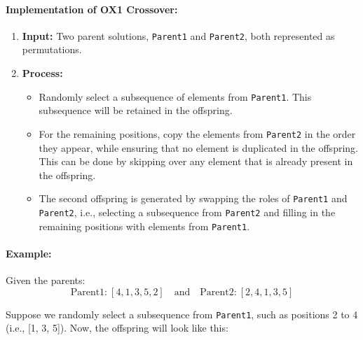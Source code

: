 \documentclass[12pt]{article}
\begin{document}
\paragraph{Implementation of OX1 Crossover:}

\begin{enumerate}
    \item \textbf{Input:} Two parent solutions, \texttt{Parent1} and \texttt{Parent2}, both represented as permutations.
    \item \textbf{Process:}
    \begin{itemize}
        \item Randomly select a subsequence of elements from \texttt{Parent1}. This subsequence will be retained in the offspring.
        \item For the remaining positions, copy the elements from \texttt{Parent2} in the order they appear, while ensuring that no element is duplicated in the offspring. This can be done by skipping over any element that is already present in the offspring.
        \item The second offspring is generated by swapping the roles of \texttt{Parent1} and \texttt{Parent2}, i.e., selecting a subsequence from \texttt{Parent2} and filling in the remaining positions with elements from \texttt{Parent1}.
    \end{itemize}
\end{enumerate}

\paragraph{Example:}

Given the parents:
\[
\text{Parent1:} \ [4, 1, 3, 5, 2]
\quad \text{and} \quad \text{Parent2:} \ [2, 4, 1, 3, 5]
\]

Suppose we randomly select a subsequence from \texttt{Parent1}, such as positions 2 to 4 (i.e., [1, 3, 5]). Now, the offspring will look like this:
\end{document}
